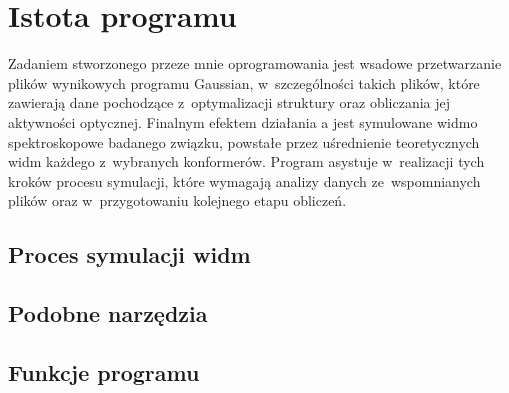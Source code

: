 \section{Istota programu}\label{tesliper:essence}
Zadaniem stworzonego przeze mnie oprogramowania jest wsadowe przetwarzanie plików wynikowych
  programu Gaussian, w~szczególności takich plików, które zawierają
  dane pochodzące z~optymalizacji struktury oraz obliczania jej aktywności optycznej.
Finalnym efektem działania \tesliper{}a jest symulowane widmo spektroskopowe badanego związku,
  powstałe przez uśrednienie teoretycznych widm każdego z~wybranych konformerów.
Program asystuje w~realizacji tych kroków procesu symulacji, które wymagają analizy danych
  ze~wspomnianych plików oraz w~przygotowaniu kolejnego etapu obliczeń.

\subsection{Proces symulacji widm}\label{essence:simulation}
\subsection{Podobne narzędzia}\label{essence:simmilar}
\subsection{Funkcje programu}\label{essence:features}
